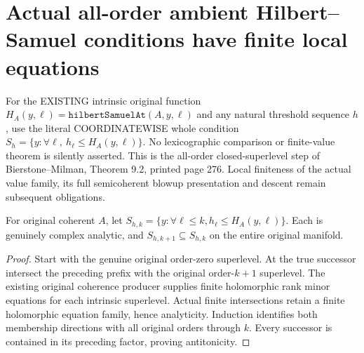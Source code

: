 \section{Actual all-order ambient Hilbert--Samuel conditions have finite local equations}

For the EXISTING intrinsic original function $H_A(y,\ell)=
\texttt{hilbertSamuelAt}(A,y,\ell)$ and any natural threshold sequence
$h$, use the literal COORDINATEWISE whole condition
$S_h=\{y:\forall\ell,\ h_\ell\leq H_A(y,\ell)\}$.
No lexicographic comparison or finite-value theorem is silently asserted.
This is the all-order closed-superlevel step of
Bierstone--Milman\cite{bierstone-milman97-invent-math}, Theorem 9.2,
printed page 276. Local finiteness of the actual value family, its full
semicoherent blowup presentation and descent remain subsequent obligations.

\begin{lemma}
\label{hir:actual-ambient-hs-finite-prefix-analytic-chain}
\leanok
For original coherent $A$, let $S_{h,k}=\{y:\forall\ell\leq k,
 h_\ell\leq H_A(y,\ell)\}$. Each is genuinely complex analytic, and
$S_{h,k+1}\subseteq S_{h,k}$ on the entire original manifold.
\end{lemma}
\begin{proof}
Start with the genuine original order-zero superlevel. At the true successor
intersect the preceding prefix with the original order-$k+1$ superlevel.
The existing original coherence producer supplies finite holomorphic rank
minor equations for each intrinsic superlevel. Actual finite intersections
retain a finite holomorphic equation family, hence analyticity. Induction
identifies both membership directions with all original orders through $k$.
Every successor is contained in its preceding factor, proving antitonicity.
\end{proof}

